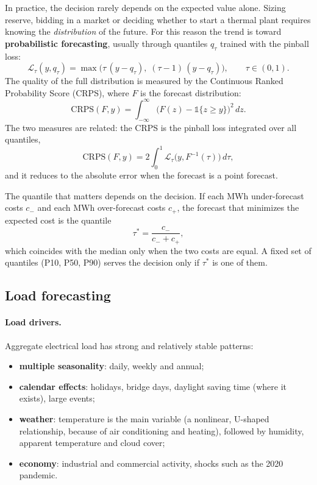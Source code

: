 \documentclass[10pt,a4paper,oneside]{article}
\begin{document}
In practice, the decision rarely depends on the expected value alone. Sizing
reserve, bidding in a market or deciding whether to start a thermal plant
requires knowing the \emph{distribution} of the future. For this reason the
trend is toward \textbf{probabilistic forecasting}, usually through quantiles
$q_\tau$ trained with the pinball loss:
\begin{equation}
  \mathcal{L}_\tau(y, q_\tau) =
  \max\big(\tau\,(y - q_\tau),\; (\tau - 1)\,(y - q_\tau)\big),
  \qquad \tau \in (0,1).
\end{equation}
The quality of the full distribution is measured by the Continuous Ranked
Probability Score (CRPS), where $F$ is the forecast distribution:
\begin{equation}
  \mathrm{CRPS}(F, y) = \int_{-\infty}^{\infty}
  \big(F(z) - \mathbb{1}\{z \ge y\}\big)^2 \, dz.
\end{equation}
The two measures are related: the CRPS is the pinball loss integrated over
all quantiles,
\begin{equation}
  \mathrm{CRPS}(F, y) = 2 \int_0^1 \mathcal{L}_\tau\big(y, F^{-1}(\tau)\big)\, d\tau,
\end{equation}
and it reduces to the absolute error when the forecast is a point forecast.

The quantile that matters depends on the decision. If each MWh
under-forecast costs $c_{-}$ and each MWh over-forecast costs $c_{+}$, the
forecast that minimizes the expected cost is the quantile
\begin{equation}
  \tau^{*} = \frac{c_{-}}{c_{-} + c_{+}},
\end{equation}
which coincides with the median only when the two costs are equal. A fixed
set of quantiles (P10, P50, P90) serves the decision only if $\tau^{*}$ is
one of them.

\subsection{Load forecasting}

\paragraph{Load drivers.} Aggregate electrical load has strong and relatively
stable patterns:
\begin{itemize}
  \item \textbf{multiple seasonality}: daily, weekly and annual;
  \item \textbf{calendar effects}: holidays, bridge days, daylight saving
    time (where it exists), large events;
  \item \textbf{weather}: temperature is the main variable (a nonlinear,
    U-shaped relationship, because of air conditioning and heating),
    followed by humidity, apparent temperature and cloud cover;
  \item \textbf{economy}: industrial and commercial activity, shocks such as
    the 2020 pandemic.
\end{itemize}
\end{document}
